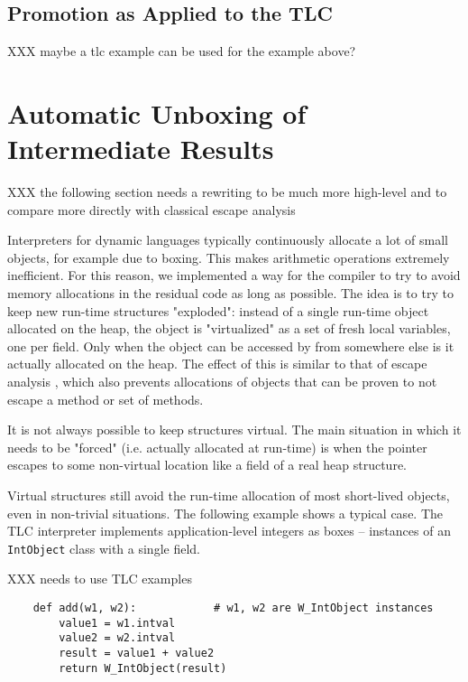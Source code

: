 \subsection{Promotion as Applied to the TLC}

XXX maybe a tlc example can be used for the example above?


\section{Automatic Unboxing of Intermediate Results}
\label{sec:virtuals}

XXX the following section needs a rewriting to be much more high-level and to
compare more directly with classical escape analysis

Interpreters for dynamic languages typically continuously allocate a lot of small
objects, for example due to boxing. This makes arithmetic operations extremely
inefficient. For this reason, we
implemented a way for the compiler to try to avoid memory allocations in the
residual code as long as possible. The idea is to try to keep new
run-time structures "exploded": instead of a single run-time object allocated on
the heap, the object is "virtualized" as a set
of fresh local variables, one per field. Only when the object can be accessed by from
somewhere else is it actually allocated on the heap. The effect of this is similar to that of
escape analysis \cite{XXX}, which also prevents allocations of objects that can
be proven to not escape a method or set of methods.

It is not always possible to keep structures virtual.  The main
situation in which it needs to be "forced" (i.e. actually allocated at
run-time) is when the pointer escapes to some non-virtual location like
a field of a real heap structure.

Virtual structures still avoid the run-time allocation of most
short-lived objects, even in non-trivial situations.  The following
example shows a typical case.  The TLC interpreter implements application-level
integers as boxes – instances of an \texttt{IntObject} class with a single
field.

XXX needs to use TLC examples
\begin{verbatim}
    def add(w1, w2):            # w1, w2 are W_IntObject instances
        value1 = w1.intval
        value2 = w2.intval
        result = value1 + value2
        return W_IntObject(result)
\end{verbatim}

